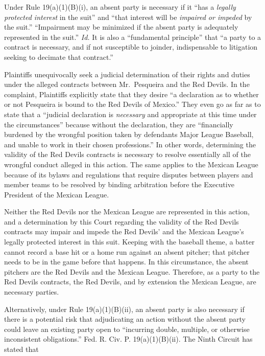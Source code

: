 \documentclass[11pt,letterpaper,twoside]{article}
\begin{document}
Under Rule 19(a)(1)(B)(i), an absent party is necessary if it ``has a
\emph{legally protected interest} in the suit'' and ``that interest will
be \emph{impaired or impeded} by the suit.'' ``Impairment may be
minimized if the absent party is adequately represented in the suit.''
\emph{Id.} It is also a ``fundamental principle'' that ``a party to a
contract is necessary, and if not susceptible to joinder, indispensable
to litigation seeking to decimate that contract.''

Plaintiffs unequivocally seek a judicial determination of their rights
and duties under the alleged contracts between Mr.~Pesqueira and the Red
Devils. In the complaint, Plaintiffs explicitly state that they desire
``a declaration as to whether or not Pesqueira is bound to the Red
Devils of Mexico.'' They even go as far as to state that a ``judicial
declaration is \emph{necessary} and appropriate at this time under the
circumstances'' because without the declaration, they are ``financially
burdened by the wrongful position taken by defendants Major League
Baseball, and unable to work in their chosen professions.'' In other
words, determining the validity of the Red Devils contracts is necessary
to resolve essentially all of the wrongful conduct alleged in this
action. The same applies to the Mexican League because of its bylaws and
regulations that require disputes between players and member teams to be
resolved by binding arbitration before the Executive President of the
Mexican League.

Neither the Red Devils nor the Mexican League are represented in this
action, and a determination by this Court regarding the validity of the
Red Devils contracts may impair and impede the Red Devils' and the
Mexican League's legally protected interest in this suit. Keeping with
the baseball theme, a batter cannot record a base hit or a home run
against an absent pitcher; that pitcher needs to be in the game before
that happens. In this circumstance, the absent pitchers are the Red
Devils and the Mexican League. Therefore, as a party to the Red Devils
contracts, the Red Devils, and by extension the Mexican League, are
necessary parties.

Alternatively, under Rule 19(a)(1)(B)(ii), an absent party is also
necessary if there is a potential risk that adjudicating an action
without the absent party could leave an existing party open to
``incurring double, multiple, or otherwise inconsistent obligations.''
Fed. R. Civ. P. 19(a)(1)(B)(ii). The Ninth Circuit has stated that
\end{document}
